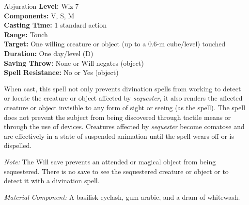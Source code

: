 {Abjuration}
{
	\textbf{Level:}
	Wiz 7\\
	\textbf{Components:}
	V, S, M\\
	\textbf{Casting Time:}
	1 standard action\\
	\textbf{Range:}
	Touch\\
	\textbf{Target:}
	One willing creature or object (up to a 0.6-m cube/level) touched\\
	\textbf{Duration:}
	One day/level (D)\\
	\textbf{Saving Throw:}
	None or Will negates (object)\\
	\textbf{Spell Resistance:}
	No or Yes (object)\\
}
{
	When cast, this spell not only prevents divination spells from working to detect or locate the creature or object affected by \emph{sequester}, it also renders the affected creature or object invisible to any form of sight or seeing (as the  spell). The spell does not prevent the subject from being discovered through tactile means or through the use of devices. Creatures affected by \emph{sequester} become comatose and are effectively in a state of suspended animation until the spell wears off or is dispelled.

	\textit{Note:} The Will save prevents an attended or magical object from being sequestered. There is no save to see the sequestered creature or object or to detect it with a divination spell.

	\textit{Material Component:}
	A basilisk eyelash, gum arabic, and a dram of whitewash.

}
